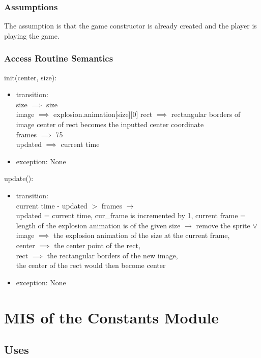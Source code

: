 \documentclass[12pt, titlepage]{article}
\begin{document}
\subsubsection {Assumptions}
The assumption is that the game constructor is already created and the player is playing the game.

\subsubsection {Access Routine Semantics}

\noindent init(center, size): 
\begin{itemize}
\item transition:\\
size $\implies$ size\\
image $\implies$ explosion.animation[size][0]
rect $\implies$ rectangular borders of image
center of rect becomes the inputted center coordinate\\
frames $\implies$ 75\\
updated $\implies$ current time
\item exception: None
\end{itemize}

\noindent update(): 
\begin{itemize}
\item transition:\\
current time - updated $>$ frames $\longrightarrow$\\updated = current time, cur\_frame is incremented by 1, current frame = length of the explosion animation is of the given size $\longrightarrow$ remove the sprite $\vee$\\image $\implies$ the explosion animation of the size at the current frame, \\center $\implies$ the center point of the rect, \\rect $\implies$ the rectangular borders of the new image, \\the center of the rect would then become center
\item exception: None
\end{itemize}


\section {MIS of the Constants Module}

\subsection {Uses}
\end{document}
